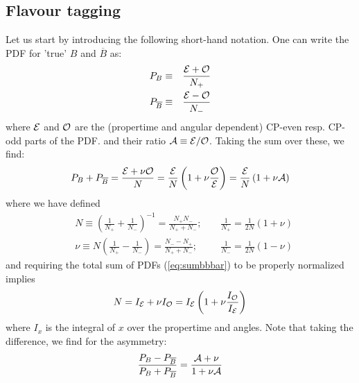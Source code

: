 \documentclass[a4paper,10pt,twosided]{article}
\begin{document}
\pagebreak


\subsection{Flavour tagging}

Let us start by introducing the following short-hand notation. One can write the 
PDF for 'true' $B$ and $\overline{B}$ as:
\begin{eqnarray}
   P_{B}           &\equiv&\frac{ {\cal E} + {\cal O}}{N_+} \\
   P_{\overline{B}} &\equiv&\frac{ {\cal E} - {\cal O}}{N_-}
\end{eqnarray}
where ${\cal E}$ and ${\cal O}$ are the (propertime and angular dependent) CP-even resp. CP-odd parts of the PDF.
and their ratio ${\cal A} \equiv {\cal E / O }$.
Taking the sum over these, we find:
\begin{equation}
   P_{B} + P_{\overline{B}} =  \frac{ {\cal E} + \nu{\cal O} }{N}  = \frac{\cal E} {N} \left( 1 + \nu \frac{ \cal O }{\cal E} \right) = \frac{\cal E}{N} \left(1 + \nu {\cal A}\right)
   \label{eq:sumbbbar}
\end{equation}
where we have defined
\begin{eqnarray}
   &  N \equiv \left( \frac{1}{N_+}+\frac{1}{N_-}\right)^{-1} = \frac{N_+N_-}{N_+ + N_-};\;\;\;\; &  \frac{1}{N_+} =\frac{1}{2N}(1+\nu) \\
   &\nu \equiv N \left( \frac{1}{N_+}-\frac{1}{N_-}\right) = \frac{N_- - N_+}{N_+ +N_-}; & \frac{1}{N_-} =\frac{1}{2N}(1-\nu) 
\end{eqnarray}
and requiring the total sum of PDFs (\ref{eq:sumbbbar}) to be properly normalized implies
\begin{equation}
   N = I_{\cal E} + \nu I_{\cal O} 
     = I_{\cal E} \left( 1 + \nu \frac{ I_{\cal O}}{I_{\cal E}}   \right)
\end{equation}
where $I_x$ is the integral of $x$ over the propertime and angles.
Note that taking the difference, we find for the asymmetry:
\begin{equation}
  \frac{P_{B} - P_{\overline{B}}}{P_{B} + P_{\overline{B}}} =  \frac{ {\cal A} + \nu}{1+\nu{\cal A}}
   \label{eq:difbbbar}
\end{equation}
\end{document}
